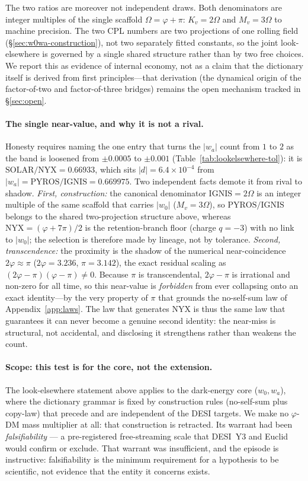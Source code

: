 \documentclass[a4paper,11pt]{article}
\begin{document}
The two ratios are moreover not independent draws. Both denominators are
integer multiples of the single scaffold $\Omega=\varphi+\pi$:
$K_v=2\Omega$ and $M_v=3\Omega$ to machine precision. The two CPL numbers are
two projections of one rolling field (\S\ref{sec:w0wa-construction}), not two
separately fitted constants, so the joint look-elsewhere is governed by a
single shared structure rather than by two free choices. We report this as
evidence of internal economy, not as a claim that the dictionary itself is
derived from first principles---that derivation (the dynamical origin of the
factor-of-two and factor-of-three bridges) remains the open mechanism tracked
in \S\ref{sec:open}.

\paragraph{The single near-value, and why it is not a rival.} Honesty requires
naming the one entry that turns the $|w_a|$ count from $1$ to $2$ as the band is
loosened from $\pm0.0005$ to $\pm0.001$ (Table~\ref{tab:lookelsewhere-tol}): it is
$\mathrm{SOLAR}/\mathrm{NYX}=0.66933$, which sits $|d|=6.4\times10^{-4}$ from
$|w_a|=\mathrm{PYROS}/\mathrm{IGNIS}=0.669975$. Two independent facts demote it from
rival to shadow. \emph{First, construction:} the canonical denominator
$\mathrm{IGNIS}=2\Omega$ is an integer multiple of the same scaffold that carries
$|w_0|$ ($M_v=3\Omega$), so $\mathrm{PYROS}/\mathrm{IGNIS}$ belongs to the shared
two-projection structure above, whereas $\mathrm{NYX}=(\varphi+7\pi)/2$ is the
retention-branch floor (charge $q=-3$) with no link to $|w_0|$; the selection is
therefore made by lineage, not by tolerance. \emph{Second, transcendence:} the
proximity is the shadow of the numerical near-coincidence $2\varphi\approx\pi$
($2\varphi=3.236$, $\pi=3.142$), the exact residual scaling as
$(2\varphi-\pi)(\varphi-\pi)\neq0$. Because $\pi$ is transcendental, $2\varphi-\pi$
is irrational and non-zero for all time, so this near-value is \emph{forbidden}
from ever collapsing onto an exact identity---by the very property of $\pi$ that
grounds the no-self-sum law of Appendix~\ref{app:laws}. The law that generates
$\mathrm{NYX}$ is thus the same law that guarantees it can never become a genuine
second identity: the near-miss is structural, not accidental, and disclosing it
strengthens rather than weakens the count.

\paragraph{Scope: this test is for the core, not the extension.} The
look-elsewhere statement above applies to the dark-energy core ($w_0,w_a$),
where the dictionary grammar is fixed by construction rules (no-self-sum plus
copy-law) that precede and are independent of the DESI targets. We make
no $\varphi$-DM mass multiplier at all: that construction is retracted. Its
warrant had been \emph{falsifiability} --- a pre-registered free-streaming
scale that DESI~Y3 and Euclid would confirm or exclude. That warrant was
insufficient, and the episode is instructive: falsifiability is the minimum
requirement for a hypothesis to be scientific, not evidence that the entity it
concerns exists.
\end{document}
